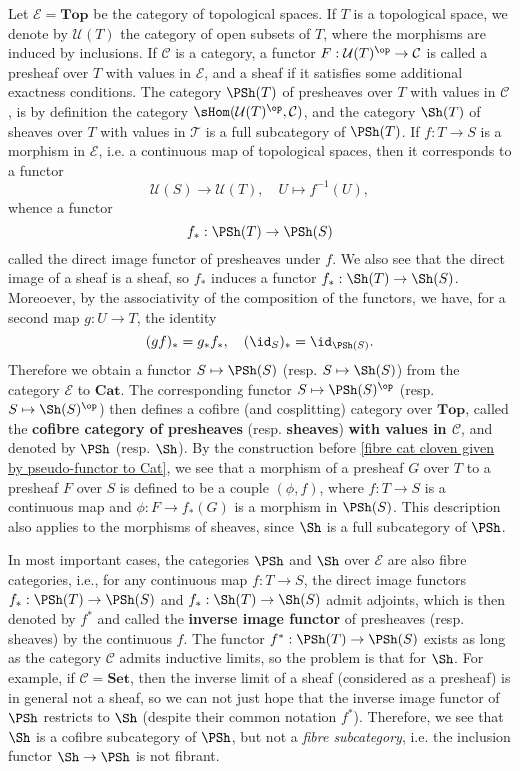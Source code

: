 \begin{example}
Let $\mathcal{E}=\mathbf{Top}$ be the category of topological spaces. If $T$ is a topological space, we denote by $\mathcal{U}(T)$ the category of open subsets of $T$, where the morphisms are induced by inclusions. If $\mathcal{C}$ is a category, a functor $F:\mathcal{U}(T)^{\op}\to \mathcal{C}$ is called a presheaf over $T$ with values in $\mathcal{E}$, and a sheaf if it satisfies some additional exactness conditions. The category $\PSh(T)$ of presheaves over $T$ with values in $\mathcal{C}$, is by definition the category $\sHom(\mathcal{U}(T)^{\op},\mathcal{C})$, and the category $\Sh(T)$ of sheaves over $T$ with values in $\mathcal{T}$ is a full subcategory of $\PSh(T)$. If $f:T\to S$ is a morphism in $\mathcal{E}$, i.e. a continuous map of topological spaces, then it corresponds to a functor
\[\mathcal{U}(S)\to \mathcal{U}(T),\quad U\mapsto f^{-1}(U),\]
whence a functor
\[f_*:\PSh(T)\to \PSh(S)\]
called the direct image functor of presheaves under $f$. We also see that the direct image of a sheaf is a sheaf, so $f_*$ induces a functor $f_*:\Sh(T)\to \Sh(S)$. Moreoever, by the associativity of the composition of the functors, we have, for a second map $g:U\to T$, the identity
\[(gf)_*=g_*f_*,\quad (\id_S)_*=\id_{\PSh(S)}.\]
Therefore we obtain a functor $S\mapsto\PSh(S)$ (resp. $S\mapsto\Sh(S)$) from the category $\mathcal{E}$ to $\mathbf{Cat}$. The corresponding functor $S\mapsto\PSh(S)^{\op}$ (resp. $S\mapsto\Sh(S)^{\op}$) then defines a cofibre (and cosplitting) category over $\mathbf{Top}$, called the \textbf{cofibre category of presheaves} (resp. \textbf{sheaves}) \textbf{with values in $\mathcal{C}$}, and denoted by $\PSh$ (resp. $\Sh$). By the construction before \cref{fibre cat cloven given by pseudo-functor to Cat}, we see that a morphism of a presheaf $G$ over $T$ to a presheaf $F$ over $S$ is defined to be a couple $(\phi,f)$, where $f:T\to S$ is a continuous map and $\phi:F\to f_*(G)$ is a morphism in $\PSh(S)$. This description also applies to the morphisms of sheaves, since $\Sh$ is a full subcategory of $\PSh$.\par
In most important cases, the categories $\PSh$ and $\Sh$ over $\mathcal{E}$ are also fibre categories, i.e., for any continuous map $f:T\to S$, the direct image functors $f_*:\PSh(T)\to \PSh(S)$ and $f_*:\Sh(T)\to \Sh(S)$ admit adjoints, which is then denoted by $f^*$ and called the \textbf{inverse image functor} of presheaves (resp. sheaves) by the continuous $f$. The functor $f^*:\PSh(T)\to \PSh(S)$ exists as long as the category $\mathcal{C}$ admits inductive limits, so the problem is that for $\Sh$. For example, if $\mathcal{C}=\mathbf{Set}$, then the inverse limit of a sheaf (considered as a presheaf) is in general not a sheaf, so we can not just hope that the inverse image functor of $\PSh$ restricts to $\Sh$ (despite their common notation $f^*$). Therefore, we see that $\Sh$ is a cofibre subcategory of $\PSh$, but not a \textit{fibre subcategory}, i.e. the inclusion functor $\Sh\to \PSh$ is not fibrant.\par

\end{example}
